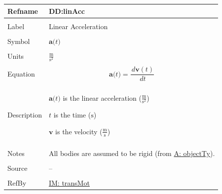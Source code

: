\documentclass[12pt]{article}
\begin{document}
\vspace{\baselineskip}
\noindent
\begin{minipage}{\textwidth}
\begin{tabular}{>{\raggedright}p{}>{\raggedright\arraybackslash}p{}}
\toprule \textbf{Refname} & \textbf{DD:linAcc}
\label{DD:linAcc}
\\ \midrule \\
Label & Linear Acceleration
        
\\ \midrule \\
Symbol & $\mathbf{a}\text{(}t\text{)}$
         
\\ \midrule \\
Units & $\frac{\text{m}}{\text{s}^{2}}$
        
\\ \midrule \\
Equation & \begin{displaymath}
           \mathbf{a}\text{(}t\text{)}=\frac{\,d\mathbf{v}\left(t\right)}{\,dt}
           \end{displaymath}
\\ \midrule \\
Description & \begin{symbDescription}
              \item{$\mathbf{a}\text{(}t\text{)}$ is the linear acceleration ($\frac{\text{m}}{\text{s}^{2}}$)}
              \item{$t$ is the time (${\text{s}}$)}
              \item{$\mathbf{v}$ is the velocity ($\frac{\text{m}}{\text{s}}$)}
              \end{symbDescription}
\\ \midrule \\
Notes & All bodies are assumed to be rigid (from \hyperref[assumpOT]{A: objectTy}).
        
\\ \midrule \\
Source & --
         
\\ \midrule \\
RefBy & \hyperref[IM:transMot]{IM: transMot}
        
\\ \bottomrule
\end{tabular}
\end{minipage}
\end{document}
